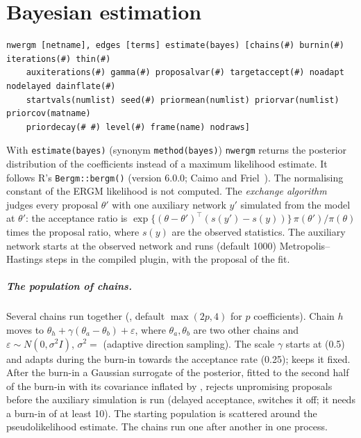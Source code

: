 \chapter{Bayesian estimation}\label{ch:bayes}

\begin{lstlisting}
nwergm [netname], edges [terms] estimate(bayes) [chains(#) burnin(#) iterations(#) thin(#)
    auxiterations(#) gamma(#) proposalvar(#) targetaccept(#) noadapt nodelayed dainflate(#)
    startvals(numlist) seed(#) priormean(numlist) priorvar(numlist) priorcov(matname)
    priordecay(# #) level(#) frame(name) nodraws]
\end{lstlisting}
With \texttt{estimate(bayes)} (synonym \texttt{method(bayes)}) \texttt{nwergm} returns the posterior distribution of the coefficients instead of a maximum likelihood estimate. It follows R's \texttt{Bergm::bergm()} (version 6.0.0; Caimo and Friel~\cite{caimo2011}). The normalising constant of the ERGM likelihood is not computed. The \emph{exchange algorithm} judges every proposal $\theta'$ with one auxiliary network $y'$ simulated from the model at $\theta'$: the acceptance ratio is $\exp\{(\theta-\theta')^\top(s(y')-s(y))\}\,\pi(\theta')/\pi(\theta)$ times the proposal ratio, where $s(y)$ are the observed statistics. The auxiliary network starts at the observed network and runs  (default 1000) Metropolis--Hastings steps in the compiled plugin, with the proposal of the fit.

\paragraph{The population of chains.} Several chains run together (, default $\max(2p,4)$ for $p$ coefficients). Chain $h$ moves to $\theta_h+\gamma(\theta_a-\theta_b)+\varepsilon$, where $\theta_a,\theta_b$ are two other chains and $\varepsilon\sim N(0,\sigma^2 I)$, $\sigma^2=$  (adaptive direction sampling). The scale $\gamma$ starts at  (0.5) and adapts during the burn-in towards the acceptance rate  (0.25);  keeps it fixed. After the burn-in a Gaussian surrogate of the posterior, fitted to the second half of the burn-in with its covariance inflated by , rejects unpromising proposals before the auxiliary simulation is run (delayed acceptance,  switches it off; it needs a burn-in of at least 10). The starting population is scattered around the pseudolikelihood estimate. The chains run one after another in one process.

